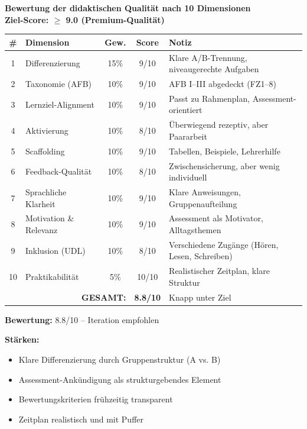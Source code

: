 \documentclass[11pt,a4paper]{article}
\begin{document}
\begin{scorebox}
\textbf{Bewertung der didaktischen Qualität nach 10 Dimensionen}\\
\textbf{Ziel-Score: $\geq$ 9.0 (Premium-Qualität)}

\vspace{1em}
\begin{tabular}{|c|l|c|c|p{4.5cm}|}
\hline
\textbf{\#} & \textbf{Dimension} & \textbf{Gew.} & \textbf{Score} & \textbf{Notiz} \\
\hline
1 & Differenzierung & 15\% & 9/10 & Klare A/B-Trennung, niveaugerechte Aufgaben \\
\hline
2 & Taxonomie (AFB) & 10\% & 9/10 & AFB I--III abgedeckt (FZ1--8) \\
\hline
3 & Lernziel-Alignment & 10\% & 9/10 & Passt zu Rahmenplan, Assessment-orientiert \\
\hline
4 & Aktivierung & 10\% & 8/10 & Überwiegend rezeptiv, aber Paararbeit \\
\hline
5 & Scaffolding & 10\% & 9/10 & Tabellen, Beispiele, Lehrerhilfe \\
\hline
6 & Feedback-Qualität & 10\% & 8/10 & Zwischensicherung, aber wenig individuell \\
\hline
7 & Sprachliche Klarheit & 10\% & 9/10 & Klare Anweisungen, Gruppenaufteilung \\
\hline
8 & Motivation \& Relevanz & 10\% & 9/10 & Assessment als Motivator, Alltagsthemen \\
\hline
9 & Inklusion (UDL) & 10\% & 8/10 & Verschiedene Zugänge (Hören, Lesen, Schreiben) \\
\hline
10 & Praktikabilität & 5\% & 10/10 & Realistischer Zeitplan, klare Struktur \\
\hline
\multicolumn{3}{|r|}{\textbf{GESAMT:}} & \textbf{8.8/10} & Knapp unter Ziel \\
\hline
\end{tabular}

\vspace{1em}
\textbf{Bewertung: } \textcolor{warningorange}{8.8/10 -- Iteration empfohlen}

\vspace{1em}
\textbf{Stärken:}
\begin{itemize}
    \item Klare Differenzierung durch Gruppenstruktur (A vs. B)
    \item Assessment-Ankündigung als strukturgebendes Element
    \item Bewertungskriterien frühzeitig transparent
    \item Zeitplan realistisch und mit Puffer
\end{itemize}


\end{scorebox}
\end{document}
